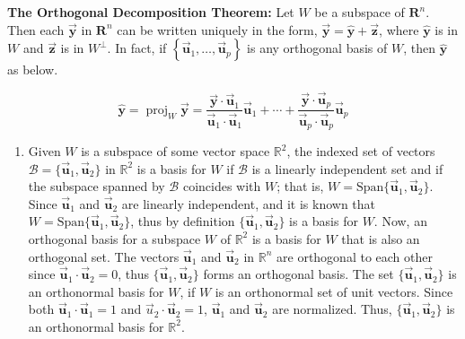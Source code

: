 \documentclass[letter,11pt]{article}
\theoremstyle{definition}
\begin{document}
\begin{tcolorbox}[boxrule=1mm,before=\hfill,after=\hfill,adjusted title={Problem 4 solutions}]
 \textbf{The Orthogonal Decomposition Theorem:} Let $W$ be a subspace of $\boldsymbol{R}^n$. Then each $\vec{\boldsymbol{y}}$ in $\boldsymbol{R}^n$ can be written uniquely in the form, $\vec{\boldsymbol{y}}= \hat{\boldsymbol{y}} + \vec{\boldsymbol{z}}$, where $\hat{\boldsymbol{y}}$ is in $W$ and $\vec{\boldsymbol{z}}$ is in $W^{\bot}$. In fact, if $\left\{\vec{\boldsymbol{u}}_1,\ldots,\vec{\boldsymbol{u}}_{p}\right\}$ is any orthogonal basis of $W$, then $\hat{\boldsymbol{y}}$ as below. 

 $$\hat{\boldsymbol{y}} = \operatorname{proj}_{W} \vec{\boldsymbol{y}} = \frac{\vec{\boldsymbol{y}}\cdot \vec{\boldsymbol{u}}_{1}}{\vec{\boldsymbol{u}}_{1} \cdot \vec{\boldsymbol{u}}_{1}}\vec{\boldsymbol{u}}_{1} + \cdots + \frac{\vec{\boldsymbol{y}}\cdot \vec{\boldsymbol{u}}_{p}}{\vec{\boldsymbol{u}}_{p} \cdot \vec{\boldsymbol{u}}_{p}}\vec{\boldsymbol{u}}_{p}$$
 
\tcblower
\begin{enumerate}[label=\roman*.]
    \item Given \( W \) is a subspace of some vector space \( \mathbb{R}^2 \), the indexed set of vectors \( \mathcal{B} = \{ \vec{\boldsymbol{u}}_{1}, \vec{\boldsymbol{u}}_{2} \} \) in \( \mathbb{R}^2 \) is a basis for \( W \) if \( \mathcal{B} \) is a linearly independent set and if the subspace spanned by \( \mathcal{B} \) coincides with \( W \); that is, \( W = \text{Span} \{ \vec{\boldsymbol{u}}_{1}, \vec{\boldsymbol{u}}_{2} \} \). Since \( \vec{\boldsymbol{u}}_{1} \) and \( \vec{\boldsymbol{u}}_{2} \) are linearly independent, and it is known that \( W = \text{Span} \{ \vec{\boldsymbol{u}}_{1}, \vec{\boldsymbol{u}}_{2} \} \), thus by definition \( \{ \vec{\boldsymbol{u}}_{1}, \vec{\boldsymbol{u}}_{2} \} \) is a basis for \( W \). Now, an orthogonal basis for a subspace \( W \) of \( \mathbb{R}^2 \) is a basis for \( W \) that is also an orthogonal set. The vectors \( \vec{\boldsymbol{u}}_{1} \) and \( \vec{\boldsymbol{u}}_{2} \) in \( \mathbb{R}^n \) are orthogonal to each other since \( \vec{\boldsymbol{u}}_{1} \cdot \vec{\boldsymbol{u}}_{2} = 0 \), thus \( \{ \vec{\boldsymbol{u}}_{1}, \vec{\boldsymbol{u}}_{2} \} \) forms an orthogonal basis. The set \( \{ \vec{\boldsymbol{u}}_{1}, \vec{\boldsymbol{u}}_{2} \} \) is an orthonormal basis for \( W \), if $W$ is an orthonormal set of unit vectors. Since both \( \vec{\boldsymbol{u}}_{1} \cdot \vec{\boldsymbol{u}}_{1} = 1 \) and \( \vec{u}_{2} \cdot \vec{\boldsymbol{u}}_{2} = 1 \), \( \vec{\boldsymbol{u}}_{1} \) and \(\vec{\boldsymbol{u}}_{2} \) are normalized. Thus, \( \{ \vec{\boldsymbol{u}}_{1}, \vec{\boldsymbol{u}}_{2} \} \) is an orthonormal basis for \( \mathbb{R}^2 \).


\end{enumerate}
\end{tcolorbox}
\end{document}
